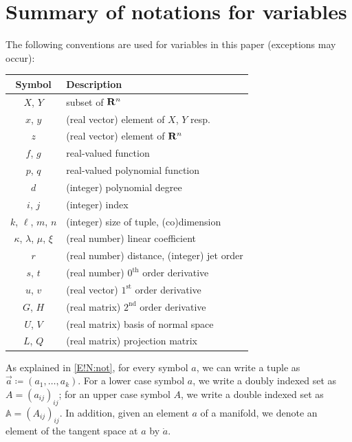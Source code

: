 \section{Summary of notations for variables}
\let\thesection\theoldsection
\label{E!A:not}

The following conventions are used for variables in this paper (exceptions may occur):

\begin{tabular}{c|l}
  Symbol & Description \\
  \hline
  $X$, $Y$ & subset of $\mathbf{R}^n$ \\
  $x$, $y$ & (real vector) element of $X$, $Y$ resp. \\
  $z$ & (real vector) element of $\mathbf{R}^n$ \\
  $f$, $g$ & real-valued function \\
  $p$, $q$ & real-valued polynomial function \\
  $d$ & (integer) polynomial degree \\
  $i$, $j$ & (integer) index \\
  $k$, $\ell$, $m$, $n$ & (integer) size of tuple, (co)dimension \\
  $\kappa$, $\lambda$, $\mu$, $\xi$ & (real number) linear coefficient \\
  $r$ & (real number) distance, (integer) jet order \\
  $s$, $t$ & (real number) $0^{\text{th}}$ order derivative \\
  $u$, $v$ & (real vector) $1^{\text{st}}$ order derivative \\
  $G$, $H$ & (real matrix) $2^{\text{nd}}$ order derivative \\
  $U$, $V$ & (real matrix) basis of normal space \\
  $L$, $Q$ & (real matrix) projection matrix
\end{tabular}

\noindent As explained in \cref{E!N:not}, for every symbol $a$, we can write a tuple as $\vec a \coloneq (a_1, \ldots, a_k)$. For a lower case symbol $a$, we write a doubly indexed set as $A = (a_{ij})_{ij}$; for an upper case symbol $A$, we write a double indexed set as $\mathbb{A} = (A_{ij})_{ij}$. In addition, given an element $a$ of a manifold, we denote an element of the tangent space at $a$ by $\dot{a}$.